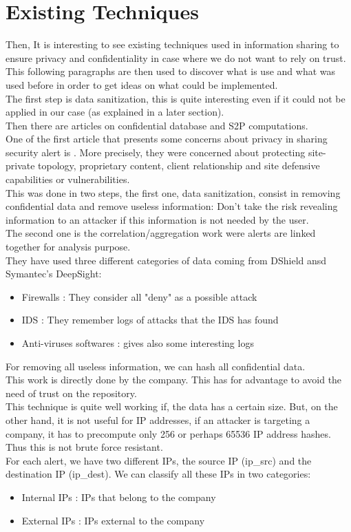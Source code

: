 \documentclass{eplmastersthesis}
\begin{document}
\section{Existing Techniques}
Then, It is interesting to see existing techniques used in information sharing to ensure privacy and confidentiality in case where we do not want to rely on trust. This following paragraphs are then used to discover what is use and what was used before in order to get ideas on what could be implemented.\\

The first step is data sanitization, this is quite interesting even if it could not be applied in our case (as explained in a later section).\\
Then there are articles on confidential database and S2P computations.\\

One of the first article that presents some concerns about privacy in sharing security alert is \cite{lincoln2004privacy}.
More precisely, they were concerned about protecting site-private topology, proprietary content, client relationship and site defensive capabilities or vulnerabilities.\\
This was done in two steps, the first one, data sanitization, consist in removing confidential data and remove useless information: Don't take the risk revealing information to an attacker if this information is not needed by the user.\\
The second one is the correlation/aggregation work were alerts are linked together for analysis purpose.\\
 They have used three different categories of data coming from DShield ansd Symantec's DeepSight:
\begin{itemize}
\item Firewalls : They consider all "deny" as a possible attack
\item IDS : They remember logs of attacks that the IDS has found
\item Anti-viruses softwares : gives also some interesting logs
\end{itemize}

For removing all useless information, we can hash all confidential data.\\
This work is directly done by the company. This has for advantage to avoid the need of trust on the repository.\\
This technique is quite well working if, the data has a certain size. But, on the other hand, it is not useful for IP addresses, if an attacker is targeting a company, it has to precompute only 256 or perhaps 65536 IP address hashes. Thus this is not brute force resistant.\\
For each alert, we have two different IPs, the source IP (ip\_src) and the destination IP (ip\_dest). We can classify all these IPs in two categories:
\begin{itemize}
	\item Internal IPs : IPs that belong to the company
	\item External IPs : IPs external to the company
\end{itemize}
\end{document}
